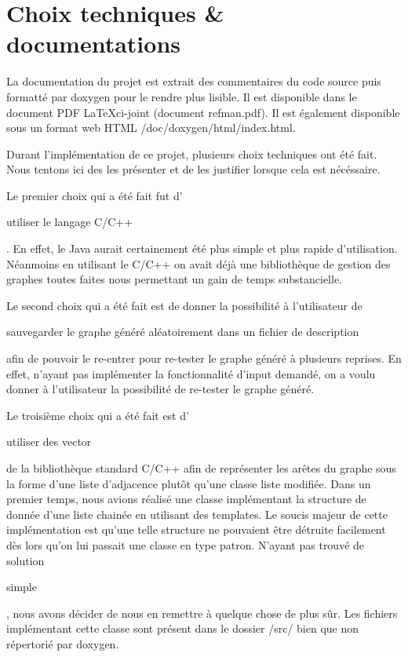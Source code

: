 \documentclass[12pt,a4paper,titlepage]{article}
\begin{document}



\clearpage{\pagestyle{empty}}



\section{Choix techniques \& documentations}
La documentation du projet est extrait des commentaires du code source puis 
formatté par doxygen pour le rendre plus lisible. Il est disponible dans le 
document PDF \LaTeX ci-joint (document \og{}refman.pdf\fg{}). Il est également disponible 
sous un format web HTML \og{}/doc/doxygen/html/index.html\fg{}.

Durant l'implémentation de ce projet, plusieurs choix techniques ont été fait. 
Nous tentons ici des les présenter et de les justifier lorsque cela est nécéssaire.

Le premier choix qui a été fait fut d'\begin{bf}utiliser le langage C/C++\end{bf}. 
En effet, le Java aurait certainement été plus simple et plus rapide d'utilisation. 
Néanmoins en utilisant le C/C++ on avait déjà une bibliothèque de gestion des graphes toutes 
faites nous permettant un gain de temps substancielle.

Le second choix qui a été fait est de donner la possibilité à l'utilisateur de 
\begin{bf}sauvegarder le graphe généré aléatoirement dans un fichier de description\end{bf} afin 
de pouvoir le re-entrer pour re-tester le graphe généré à plusieurs reprises.
En effet, n'ayant pas implémenter la fonctionnalité d'input demandé, on a 
voulu donner à l'utilisateur la possibilité de re-tester le graphe généré.

Le troisième choix qui a été fait est d'\begin{bf}utiliser des \og{}vector\fg{}\end{bf} de la bibliothèque 
standard C/C++ afin de représenter les arêtes du graphe sous la forme d'une liste
d'adjacence plutôt qu'une classe liste modifiée. Dans un premier temps, nous 
avions réalisé une classe implémentant la structure de donnée d'une liste 
chainée en utilisant des templates. 
Le soucis majeur de cette implémentation est qu'une telle structure ne 
pouvaient être détruite facilement dès lors qu'on lui passait une classe 
en type patron.
N'ayant pas trouvé de solution \begin{bf}simple\end{bf}, nous avons décider de
nous en remettre à quelque chose de plus sûr. Les fichiers implémentant cette 
classe sont présent dans le dossier \og{}/src/\fg{} bien que non répertorié par 
doxygen.
\end{document}
